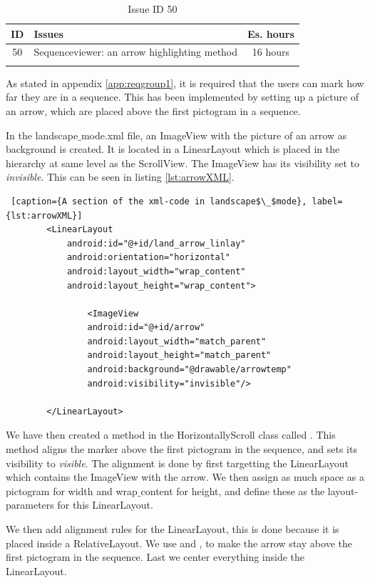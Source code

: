 \begin{longtable} { | c | p{12cm} | c | } 
\hline
	ID 	&	Issues	&		 Es. hours \\\hline
	50 	&	Sequenceviewer: an arrow highlighting method	&	16 hours \\\hline
\caption{Issue ID 50}
\label{tab:spr3_SVarrowhighlight}
\end{longtable}

As stated in appendix \ref{app:reqgroup1}, it is required that the users can mark how far they are in a sequence. This has been implemented by setting up a picture of an arrow, which are placed above the first pictogram in a sequence.

In the landscape$\_$mode.xml file, an ImageView with the picture of an arrow as background is created. It is located in a LinearLayout which is placed in the hierarchy at same level as the ScrollView. The ImageView has its visibility set to \textit{invisible}. This can be seen in listing \ref{lst:arrowXML}.

\begin{lstlisting} [caption={A section of the xml-code in landscape$\_$mode}, label={lst:arrowXML}]
        <LinearLayout
            android:id="@+id/land_arrow_linlay"
            android:orientation="horizontal"
            android:layout_width="wrap_content"
            android:layout_height="wrap_content">

                <ImageView
                android:id="@+id/arrow"
                android:layout_width="match_parent"
                android:layout_height="match_parent"
                android:background="@drawable/arrowtemp"
                android:visibility="invisible"/>
                
        </LinearLayout>
\end{lstlisting}

We have then created a method in the HorizontallyScroll class called . This method aligns the marker above the first pictogram in the sequence, and sets its visibility to \textit{visible}. The alignment is done by first targetting the LinearLayout which contains the ImageView with the arrow. We then assign as much space as a pictogram for width and wrap$\_$content for height, and define these as the layout-parameters for this LinearLayout.

We then add alignment rules for the LinearLayout, this is done because it is placed inside a RelativeLayout. We use  and \newline {}, to make the arrow stay above the first pictogram in the sequence. Last we center everything inside the LinearLayout.

